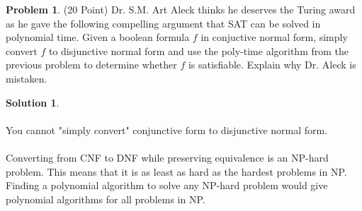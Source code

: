 \documentclass{article}
\theoremstyle{definition}
\newtheorem{problem}{Problem}
\newtheorem*{solution}{Solution}
\begin{document}
\newpage

\begin{problem} (20 Point) 
Dr. S.M. Art Aleck thinks he deserves the Turing award as he gave the
following compelling argument that SAT can be solved in polynomial
time. Given a boolean formula $f$ in conjuctive normal form, simply
convert $f$ to disjunctive normal form and use the poly-time algorithm
from the previous problem to determine whether $f$ is
satisfiable. Explain why Dr. Aleck is mistaken. 
\end{problem}
\begin{solution} \\
\\
You cannot "simply convert" conjunctive form to disjunctive normal form.\\
\\
Converting from CNF to DNF while preserving equivalence is an NP-hard problem. This means that it is as least as hard as the hardest problems in NP. Finding a polynomial algorithm to solve any NP-hard problem would give polynomial algorithms for all problems in NP.\\

\end{solution}

\newpage
\end{document}
